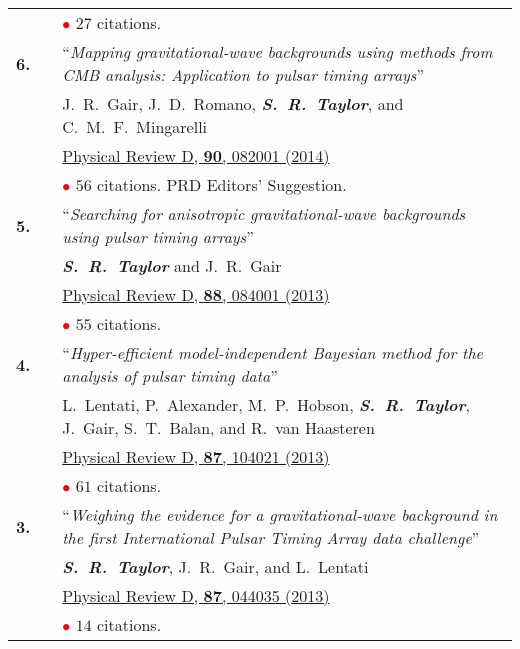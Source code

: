 \documentclass[11pt,letterpaper,sans]{moderncv}
\begin{document}
{\begin{longtable}{rp{0.3cm}p{15.8cm}}
&& \textcolor{red}{$\bullet$} $27$ citations. \vspace{0.09cm}\\
\textbf{6.} & & ``\textit{Mapping gravitational-wave backgrounds using methods from CMB analysis: Application to pulsar timing arrays}'' \\ 
&& J.~R.~Gair, J.~D.~Romano, \textit{\textbf{S.~R.~Taylor}}, and C.~M.~F.~Mingarelli \\ 
&& \href{http://journals.aps.org/prd/abstract/10.1103/PhysRevD.90.082001}{{\color{color1} Physical Review D, \textbf{90}, 082001 (2014)}} \\
&& \textcolor{red}{$\bullet$} $56$ citations. PRD Editors' Suggestion.\vspace{0.09cm}\\
\textbf{5.} & & ``\textit{Searching for anisotropic gravitational-wave backgrounds using pulsar timing arrays}'' \\ 
&& \textit{\textbf{S.~R.~Taylor}} and J.~R.~Gair \\ 
&& \href{http://journals.aps.org/prd/abstract/10.1103/PhysRevD.88.084001}{{\color{color1} Physical Review D, \textbf{88}, 084001 (2013)}} \\
&& \textcolor{red}{$\bullet$} $55$ citations. \vspace{0.09cm}\\
\textbf{4.} & & ``\textit{Hyper-efficient model-independent Bayesian method for the analysis of pulsar timing data}'' \\ 
&& L.~Lentati, P.~Alexander, M.~P.~Hobson, \textit{\textbf{S.~R.~Taylor}}, J.~Gair, S.~T.~Balan, and R.~van Haasteren \\ 
&& \href{http://journals.aps.org/prd/abstract/10.1103/PhysRevD.87.104021}{{\color{color1} Physical Review D, \textbf{87}, 104021 (2013)}} \\
&& \textcolor{red}{$\bullet$} $61$ citations. \vspace{0.09cm}\\
\textbf{3.} & & ``\textit{Weighing the evidence for a gravitational-wave background in the first International Pulsar Timing Array data challenge}'' \\ 
&& \textit{\textbf{S.~R.~Taylor}}, J.~R.~Gair, and L.~Lentati \\ 
&& \href{http://journals.aps.org/prd/abstract/10.1103/PhysRevD.87.044035}{{\color{color1} Physical Review D, \textbf{87}, 044035 (2013)}} \\
&& \textcolor{red}{$\bullet$} $14$ citations. \vspace{0.09cm}\\

\end{longtable}}
\end{document}
